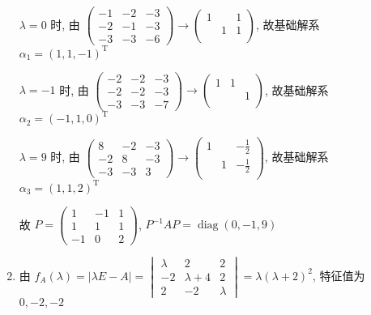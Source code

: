 \begin{enumerate}
			       \( \lambda = 0 \) 时, 由 \( \begin{pmatrix}
				       -1 & -2 & -3 \\
				       -2 & -1 & -3 \\
				       -3 & -3 & -6
			       \end{pmatrix} \rightarrow \begin{pmatrix}
				       1 &   & 1 \\
				         & 1 & 1 \\
				         &   &
			       \end{pmatrix} \), 故基础解系 \( \alpha_{1} = (1, 1, -1)^{\mathrm{T}} \)

			       \( \lambda = -1 \) 时, 由 \( \begin{pmatrix}
				       -2 & -2 & -3 \\
				       -2 & -2 & -3 \\
				       -3 & -3 & -7
			       \end{pmatrix} \rightarrow \begin{pmatrix}
				       1 & 1 &   \\
				         &   & 1 \\
				         &   &
			       \end{pmatrix} \), 故基础解系 \( \alpha_{2} = (-1, 1, 0)^{\mathrm{T}} \)

			       \( \lambda = 9 \) 时, 由 \( \begin{pmatrix}
				       8  & -2 & -3 \\
				       -2 & 8  & -3 \\
				       -3 & -3 & 3
			       \end{pmatrix} \rightarrow \begin{pmatrix}
				       1 &   & -\frac{1}{2} \\
				         & 1 & -\frac{1}{2} \\
				         &   &
			       \end{pmatrix} \), 故基础解系 \( \alpha_{3} = (1, 1, 2)^{\mathrm{T}} \)

			       故 \( P = \begin{pmatrix}
				       1  & -1 & 1 \\
				       1  & 1  & 1 \\
				       -1 & 0  & 2
			       \end{pmatrix} \), \( P^{-1}AP = \operatorname{diag}(0, -1, 9) \)
			 \item %
			       由 \( f_{A}(\lambda) = |\lambda E - A| = \begin{vmatrix}
				       \lambda & 2           & 2       \\
				       -2      & \lambda + 4 & 2       \\
				       2       & -2          & \lambda
			       \end{vmatrix} = \lambda(\lambda + 2)^{2} \), 特征值为 \( 0, -2, -2 \)


\end{enumerate}
